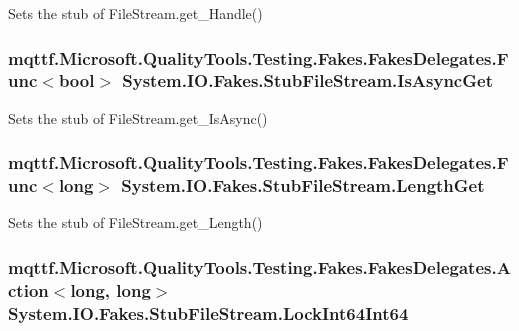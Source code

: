 Sets the stub of File\-Stream.\-get\-\_\-\-Handle()

\hypertarget{class_system_1_1_i_o_1_1_fakes_1_1_stub_file_stream_a25ba1d774c342bd20d9f0b2f0a717193}{
\subsubsection[{Is\-Async\-Get}]{\setlength{\rightskip}{0pt plus 5cm}mqttf.\-Microsoft.\-Quality\-Tools.\-Testing.\-Fakes.\-Fakes\-Delegates.\-Func$<$bool$>$ System.\-I\-O.\-Fakes.\-Stub\-File\-Stream.\-Is\-Async\-Get}}\label{class_system_1_1_i_o_1_1_fakes_1_1_stub_file_stream_a25ba1d774c342bd20d9f0b2f0a717193}


Sets the stub of File\-Stream.\-get\-\_\-\-Is\-Async()

\hypertarget{class_system_1_1_i_o_1_1_fakes_1_1_stub_file_stream_a410868c5e5f2f60a3dfcb4106ecb3bab}{
\subsubsection[{Length\-Get}]{\setlength{\rightskip}{0pt plus 5cm}mqttf.\-Microsoft.\-Quality\-Tools.\-Testing.\-Fakes.\-Fakes\-Delegates.\-Func$<$long$>$ System.\-I\-O.\-Fakes.\-Stub\-File\-Stream.\-Length\-Get}}\label{class_system_1_1_i_o_1_1_fakes_1_1_stub_file_stream_a410868c5e5f2f60a3dfcb4106ecb3bab}


Sets the stub of File\-Stream.\-get\-\_\-\-Length()

\hypertarget{class_system_1_1_i_o_1_1_fakes_1_1_stub_file_stream_a5349cd1264a9a0a2586131d1ca4a1669}{
\subsubsection[{Lock\-Int64\-Int64}]{\setlength{\rightskip}{0pt plus 5cm}mqttf.\-Microsoft.\-Quality\-Tools.\-Testing.\-Fakes.\-Fakes\-Delegates.\-Action$<$long, long$>$ System.\-I\-O.\-Fakes.\-Stub\-File\-Stream.\-Lock\-Int64\-Int64}}\label{class_system_1_1_i_o_1_1_fakes_1_1_stub_file_stream_a5349cd1264a9a0a2586131d1ca4a1669}


